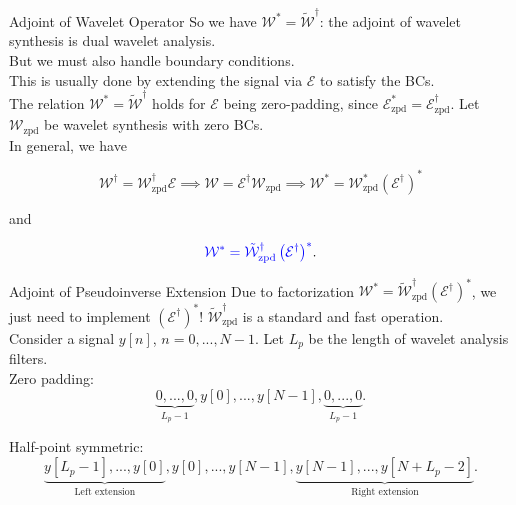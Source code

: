 \documentclass[xcolor=dvipsnames,t]{beamer} %
\begin{document}
\begin{frame}{Adjoint of Wavelet Operator}
   So we have $\mathcal{W}^\ast = \tilde{\mathcal{W}}^\dagger$: the adjoint of wavelet synthesis is dual wavelet analysis.\\

   But we must also handle boundary conditions.\\

   This is usually done by extending the signal via $\mathcal{E}$ to satisfy the BCs.\\

   The relation $\mathcal{W}^\ast = \tilde{\mathcal{W}}^\dagger$ holds for $\mathcal{E}$ being zero-padding, since $\mathcal{E}_\text{zpd}^\ast = \mathcal{E}_\text{zpd}^\dagger$.  Let $\mathcal{W}_\text{zpd}$ be wavelet synthesis with zero BCs.\\

   In general, we have

   \[ \mathcal{W}^\dagger = \mathcal{W}_\text{zpd}^\dagger\mathcal{E} \implies \mathcal{W}=\mathcal{E}^\dagger\mathcal{W}_\text{zpd} \implies \mathcal{W}^\ast = \mathcal{W}_\text{zpd}^\ast\left(\mathcal{E}^\dagger\right)^\ast \]

   and

   \[ {\color{blue} \mathcal{W}^\ast = \tilde{\mathcal{W}}_\text{zpd}^\dagger \left(\mathcal{E}^\dagger\right)^\ast}. \] 


\end{frame}

\begin{frame}{Adjoint of Pseudoinverse Extension}
   Due to factorization $\mathcal{W}^\ast = \tilde{\mathcal{W}}_\text{zpd}^\dagger(\mathcal{E}^\dagger)^\ast$, we just need to implement $(\mathcal{E}^\dagger)^\ast$!  $\tilde{\mathcal{W}}_\text{zpd}^\dagger$ is a standard and fast operation.\\[.5em]

   Consider a signal $y[n]$, $n=0,...,N-1$.  Let $L_p$ be the length of wavelet analysis filters.\\[.5em]

   Zero padding:
   \[ \underbrace{0, ..., 0}_{L_p-1}, y[0], ..., y[N-1], \underbrace{0, ..., 0}_{L_p-1}. \]

   Half-point symmetric:
   \[ \underbrace{y[L_p-1], ..., y[0]}_\text{Left extension}, y[0], ..., y[N-1], \underbrace{y[N-1], ..., y[N+L_p-2]}_\text{Right extension}. \] 

\end{frame}
\end{document}
